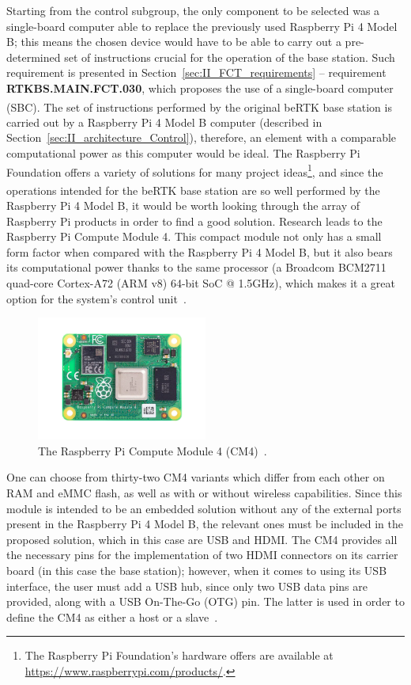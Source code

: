 Starting from the control subgroup, the only component to be selected was a single-board computer able to replace the previously used Raspberry Pi 4 Model B; this means the chosen device would have to be able to carry out a pre-determined set of instructions crucial for the operation of the base station. Such requirement is presented in Section~\ref{sec:II_FCT_requirements} -- requirement \textbf{RTKBS.MAIN.FCT.030}, which proposes the use of a single-board computer (SBC).
The set of instructions performed by the original beRTK\textsuperscript{\textregistered} base station is carried out by a Raspberry Pi 4 Model B computer (described in Section~\ref{sec:II_architecture_Control}), therefore, an element with a comparable computational power as this computer would be ideal. The Raspberry Pi Foundation offers a variety of solutions for many project ideas\footnote[7]{The Raspberry Pi Foundation's hardware offers are available at \url{https://www.raspberrypi.com/products/}.}, and since the operations intended for the beRTK\textsuperscript{\textregistered} base station are so well performed by the Raspberry Pi 4 Model B, it would be worth looking through the array of Raspberry Pi products in order to find a good solution. Research leads to the Raspberry Pi Compute Module 4.
This compact module not only has a small form factor when compared with the Raspberry Pi 4 Model B, but it also bears its computational power thanks to the same processor (a Broadcom BCM2711 quad-core Cortex-A72 (ARM v8) 64-bit SoC @ 1.5GHz), which makes it a great option for the system's control unit~\cite{CM4}.

\begin{figure}[h]
	\centering
	\includegraphics[width=0.5\textwidth]{Chapters/Figures/CM4.png}
	\caption{The Raspberry Pi Compute Module 4 (CM4)~\cite{CM4}.}
	\label{fig:CM4}
\end{figure}

One can choose from thirty-two CM4 variants which differ from each other on RAM and eMMC flash, as well as with or without wireless capabilities. Since this module is intended to be an embedded solution without any of the external ports present in the Raspberry Pi 4 Model B, the relevant ones must be included in the proposed solution, which in this case are USB and HDMI. The CM4 provides all the necessary pins for the implementation of two HDMI connectors on its carrier board (in this case the base station); however, when it comes to using its USB interface, the user must add a USB hub, since only two USB data pins are provided, along with a USB On-The-Go (OTG) pin. The latter is used in order to define the CM4 as either a host or a slave~\cite{CM4}.

